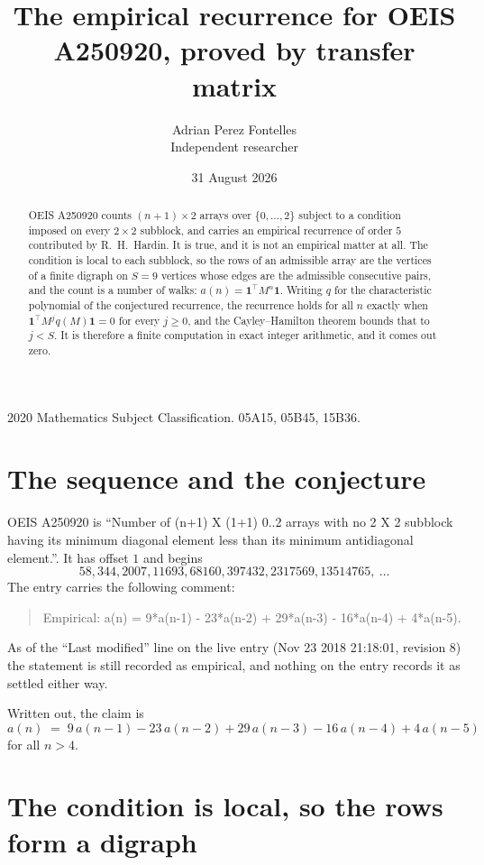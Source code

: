 \documentclass[11pt,a4paper]{article}
\title{The empirical recurrence for OEIS A250920, proved by transfer matrix}
\author{Adrian Perez Fontelles\\ \small Independent researcher}
\date{31 August 2026}
\theoremstyle{plain}
\theoremstyle{definition}
\begin{document}
\maketitle

\begin{abstract}
OEIS A250920 counts $(n+1)\times2$ arrays over $\{0,\dots,2\}$ subject to a condition imposed on
every $2\times2$ subblock, and carries an empirical recurrence of order $5$ contributed
by R.~H.~Hardin. It is true, and it is not an empirical matter at all. The condition is local
to each subblock, so the rows of an admissible array are the vertices of a finite digraph
on $S=9$ vertices whose edges are the admissible consecutive pairs, and the count is a
number of walks: $a(n)=\mathbf{1}^{\!\top}M^{n}\mathbf{1}$. Writing $q$
for the characteristic polynomial of the conjectured recurrence, the recurrence holds for all
$n$ exactly when $\mathbf{1}^{\!\top}M^{j}q(M)\mathbf{1}=0$ for every $j\ge0$, and the
Cayley--Hamilton theorem bounds that to $j<S$. It is therefore a finite computation in exact
integer arithmetic, and it comes out zero.
\end{abstract}

\noindent\small 2020 Mathematics Subject Classification. 05A15, 05B45, 15B36.\normalsize

\section{The sequence and the conjecture}

OEIS A250920 is ``Number of (n+1) X (1+1) 0..2 arrays with no 2 X 2 subblock having its minimum diagonal element less than its minimum antidiagonal element.''. It has offset $1$ and begins
\[
58, 344, 2007, 11693, 68160, 397432, 2317569, 13514765,\ \dots
\]
The entry carries the following comment:
\begin{quote}\small
Empirical: a(n) = 9*a(n-1) - 23*a(n-2) + 29*a(n-3) - 16*a(n-4) + 4*a(n-5).
\end{quote}
As of the ``Last modified'' line on the live entry (Nov 23 2018 21:18:01, revision 8) the statement is
still recorded as empirical, and nothing on the entry records it as settled either way.

Written out, the claim is
\begin{equation}\label{eq:conj}
a(n)\;=\;9\,a(n-1) - 23\,a(n-2) + 29\,a(n-3) - 16\,a(n-4) + 4\,a(n-5)
\end{equation}
for all $n>4$.

\section{The condition is local, so the rows form a digraph}
\end{document}
